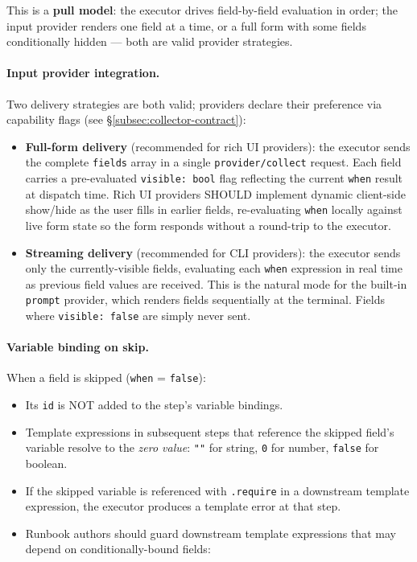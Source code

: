 \noindent
This is a \textbf{pull model}: the executor drives field-by-field evaluation in order;
the input provider renders one field at a time, or a full form with some fields
conditionally hidden — both are valid provider strategies.

\paragraph{Input provider integration.}
Two delivery strategies are both valid; providers declare their preference via
capability flags (see §\ref{subsec:collector-contract}):

\begin{itemize}
  \item \textbf{Full-form delivery} (recommended for rich UI providers): the executor
        sends the complete \texttt{fields} array in a single \texttt{provider/collect}
        request.  Each field carries a pre-evaluated \texttt{visible: bool} flag
        reflecting the current \texttt{when} result at dispatch time.  Rich UI
        providers SHOULD implement dynamic client-side show/hide as the user fills in
        earlier fields, re-evaluating \texttt{when} locally against live form state so
        the form responds without a round-trip to the executor.
  \item \textbf{Streaming delivery} (recommended for CLI providers): the executor
        sends only the currently-visible fields, evaluating each \texttt{when}
        expression in real time as previous field values are received.  This is the
        natural mode for the built-in \texttt{prompt} provider, which renders fields
        sequentially at the terminal.  Fields where \texttt{visible: false} are
        simply never sent.
\end{itemize}

\paragraph{Variable binding on skip.}
When a field is skipped (\texttt{when} = \texttt{false}):

\begin{itemize}
  \item Its \texttt{id} is NOT added to the step's variable bindings.
  \item Template expressions in subsequent steps that reference the skipped field's
        variable resolve to the \emph{zero value}: \texttt{""} for string,
        \texttt{0} for number, \texttt{false} for boolean.
  \item If the skipped variable is referenced with \texttt{.require} in a downstream
        template expression, the executor produces a template error at that step.
  \item Runbook authors should guard downstream template expressions that may depend
        on conditionally-bound fields:
\end{itemize}

